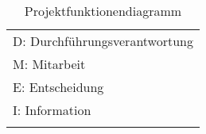 \begin{longtable}{l|c|c|c|c|c|c}
  \midrule
  \multicolumn{7}{l}{\small D: Durchführungsverantwortung}                                                                        \\
  \multicolumn{7}{l}{\small M: Mitarbeit}                                                                                         \\
  \multicolumn{7}{l}{\small E: Entscheidung}                                                                                      \\
  \multicolumn{7}{l}{\small I: Information}                                                                                       \\
  \bottomrule

  \caption{Projektfunktionendiagramm}
  \label{tab:projektfunktionendiagramm}
\end{longtable}